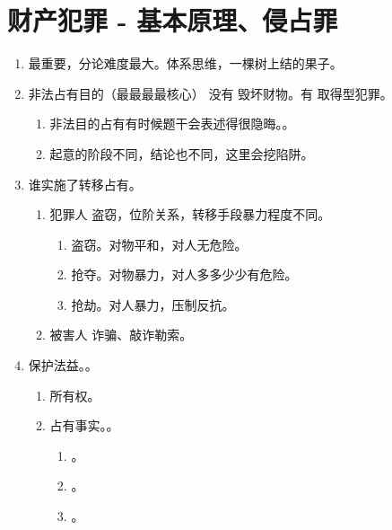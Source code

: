 \section{财产犯罪 - 基本原理、侵占罪}

\begin{enumerate}
  \item 最重要，分论难度最大。体系思维，一棵树上结的果子。
  \item 非法占有目的（最最最最核心） \yjt 没有 \yjt 毁坏财物。有 \yjt 取得型犯罪。
        \begin{enumerate}
          \item 非法目的占有有时候题干会表述得很隐晦。。
          \item 起意的阶段不同，结论也不同，这里会挖陷阱。
        \end{enumerate}
  \item 谁实施了转移占有。
        \begin{enumerate}
          \item 犯罪人 \yjt 盗窃，位阶关系，转移手段暴力程度不同。
                \begin{enumerate}
                  \item 盗窃。对物平和，对人无危险。
                  \item 抢夺。对物暴力，对人多多少少有危险。
                  \item 抢劫。对人暴力，压制反抗。
                \end{enumerate}
          \item 被害人 \yjt 诈骗、敲诈勒索。
        \end{enumerate}
  \item 保护法益。。
        \begin{enumerate}
          \item 所有权。
          \item 占有事实。。
                \begin{enumerate}
                  \item {}。
                  \item {}。
                  \item {}。
                \end{enumerate}

\end{enumerate}
\end{enumerate}
